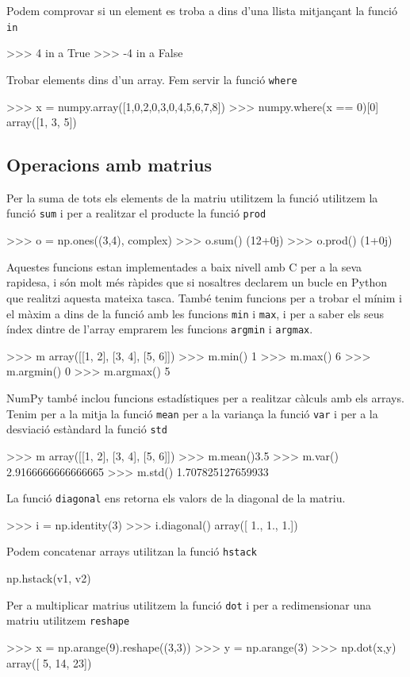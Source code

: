 Podem comprovar si un element es troba a dins d'una llista mitjançant la funció {\tt in}
\begin{blockcode}
>>> 4 in a
True
>>> -4 in a
False
\end{blockcode}
Trobar elements dins d'un array. Fem servir la funció {\tt where}
\begin{blockcode}
>>> x = numpy.array([1,0,2,0,3,0,4,5,6,7,8])
>>> numpy.where(x == 0)[0]
array([1, 3, 5])
\end{blockcode}
\subsection{Operacions amb matrius}
Per la suma de tots els elements de la matriu utilitzem la funció utilitzem la funció {\tt sum} i per a realitzar el producte la funció {\tt prod}
\begin{blockcode}
>>> o = np.ones((3,4), complex)
>>> o.sum()
(12+0j)
>>> o.prod()
(1+0j)
\end{blockcode}
Aquestes funcions estan implementades a baix nivell amb C per a la seva rapidesa, i són molt més ràpides que si nosaltres declarem un bucle en Python que realitzi aquesta mateixa tasca.
També tenim funcions per a trobar el mínim i el màxim a dins de la funció amb les funcions {\tt min} i {\tt max}, i per a saber els seus índex dintre de l'array emprarem les funcions {\tt argmin} i {\tt argmax}.
\begin{blockcode}
>>> m
array([[1, 2],
       [3, 4],
       [5, 6]])
>>> m.min()
1
>>> m.max()
6
>>> m.argmin()
0
>>> m.argmax()
5
\end{blockcode}
NumPy també inclou funcions estadístiques per a realitzar càlculs amb els arrays. Tenim per a la mitja la funció {\tt mean} per a la variança la funció {\tt var} i per a la desviació estàndard la funció {\tt std}
\begin{blockcode}
>>> m
array([[1, 2],
       [3, 4],
       [5, 6]])
>>> m.mean()3.5
>>> m.var()
2.9166666666666665
>>> m.std()
1.707825127659933
\end{blockcode}
La funció {\tt diagonal} ens retorna els valors de la diagonal de la matriu.
\begin{blockcode}
>>> i = np.identity(3)
>>> i.diagonal()
array([ 1.,  1.,  1.])
\end{blockcode}
Podem concatenar arrays utilitzan la funció {\tt hstack}
\begin{blockcode}
np.hstack(v1, v2)
\end{blockcode}
Per a multiplicar matrius utilitzem la funció {\tt dot} i per a redimensionar una matriu utilitzem {\tt reshape}
\begin{blockcode}
>>> x = np.arange(9).reshape((3,3))
>>> y = np.arange(3)
>>> np.dot(x,y)
array([ 5, 14, 23])
\end{blockcode}
